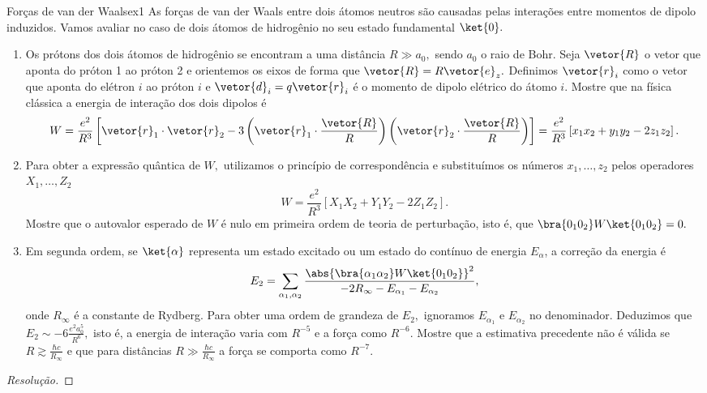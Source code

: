 \begin{exercício}{Forças de van der Waals}{ex1}
   As forças de van der Waals entre dois átomos neutros são causadas pelas interações entre momentos de dipolo induzidos. Vamos avaliar no caso de dois átomos de hidrogênio no seu estado fundamental \(\ket{0}.\)
   \begin{enumerate}[label=(\alph*)]
      \item Os prótons dos dois átomos de hidrogênio se encontram a uma distância \(R \gg a_0,\) sendo \(a_0\) o raio de Bohr. Seja \(\vetor{R}\) o vetor que aponta do próton 1 ao próton 2 e orientemos os eixos de forma que \(\vetor{R} = R\vetor{e}_z.\) Definimos \(\vetor{r}_i\) como o vetor que aponta do elétron \(i\) ao próton \(i\) e \(\vetor{d}_i = q \vetor{r}_i\) é o momento de dipolo elétrico do átomo \(i\). Mostre que na física clássica a energia de interação dos dois dipolos é
         \begin{equation*}
            W = \frac{e^2}{R^3}\left[\vetor{r}_1 \cdot \vetor{r}_2 - 3 \left(\vetor{r}_1 \cdot \frac{\vetor{R}}{R}\right)\left(\vetor{r}_2 \cdot \frac{\vetor{R}}{R}\right)\right] = \frac{e^2}{R^3} \left[x_1x_2 + y_1 y_2 - 2z_1 z_2\right].
         \end{equation*}
      \item Para obter a expressão quântica de \(W,\) utilizamos o princípio de correspondência e substituímos os números \(x_1, \dots, z_2\) pelos operadores \(X_1, \dots, Z_2\)
         \begin{equation*}
             W = \frac{e^2}{R^3} \left[X_1X_2 + Y_1 Y_2 - 2Z_1 Z_2\right].
         \end{equation*}
         Mostre que o autovalor esperado de \(W\) é nulo em primeira ordem de teoria de perturbação, isto é, que \(\bra{0_1 0_2}W\ket{0_1 0_2} = 0.\)
      \item Em segunda ordem, se \(\ket{\alpha}\) representa um estado excitado ou um estado do contínuo de energia \(E_\alpha\), a correção da energia é
         \begin{equation*}
            E_2 = \sum_{\alpha_1,\alpha_2} \frac{\abs{\bra{\alpha_1 \alpha_2} W \ket{0_1 0_2}}^2}{-2 R_\infty - E_{\alpha_1} - E_{\alpha_2}},
         \end{equation*}
         onde \(R_\infty\) é a constante de Rydberg. Para obter uma ordem de grandeza de \(E_2,\) ignoramos \(E_{\alpha_1}\) e \(E_{\alpha_2}\) no denominador. Deduzimos que \(E_2 \sim -6 \frac{e^2 a_0^5}{R^6},\) isto é, a energia de interação varia com \(R^{-5}\) e a força como \(R^{-6}.\) Mostre que a estimativa precedente não é válida se \(R \gtrsim \frac{\hbar c}{R_\infty}\) e que para distâncias \(R \gg \frac{\hbar c}{R_\infty}\) a força se comporta como \(R^{-7}.\)
   \end{enumerate}
\end{exercício}
\begin{proof}[Resolução]
    
\end{proof}
